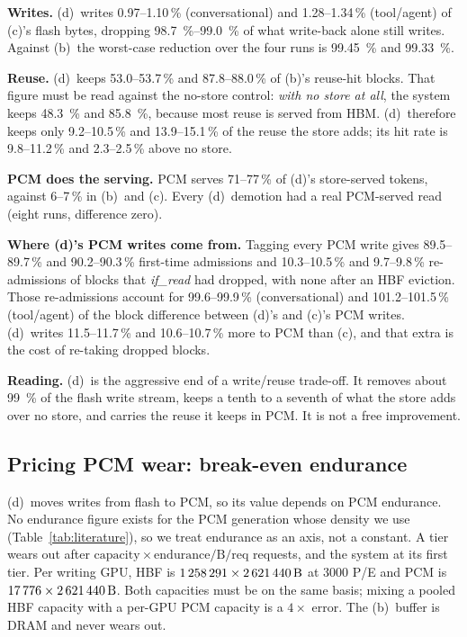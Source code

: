 \documentclass[conference]{IEEEtran}
\newcommand{\cfgb}{\textsf{(b)}}
\newcommand{\cfgc}{\textsf{(c)}}
\newcommand{\cfgd}{\textsf{(d)}}
\begin{document}
\textbf{Writes.} \cfgd\ writes 0.97--1.10\,\% (conversational) and
1.28--1.34\,\% (tool/agent) of \cfgc's flash bytes, dropping
\SIrange{98.7}{99.0}{\percent} of what write-back alone still writes. Against
\cfgb\ the worst-case reduction over the four runs is \SI{99.45}{\percent} and
\SI{99.33}{\percent}.

\textbf{Reuse.} \cfgd\ keeps 53.0--53.7\,\% and 87.8--88.0\,\% of \cfgb's
reuse-hit blocks. That figure must be read against the no-store control:
\emph{with no store at all}, the system keeps \SI{48.3}{\percent} and
\SI{85.8}{\percent}, because most reuse is served from HBM. \cfgd\ therefore
keeps only 9.2--10.5\,\% and 13.9--15.1\,\% of the reuse the store adds; its hit
rate is 9.8--11.2\,\% and 2.3--2.5\,\% above no store.

\textbf{PCM does the serving.} PCM serves 71--77\,\% of \cfgd's store-served
tokens, against 6--7\,\% in \cfgb\ and \cfgc. Every \cfgd\ demotion had a real
PCM-served read (eight runs, difference zero).

\textbf{Where \cfgd's PCM writes come from.} Tagging every PCM write gives
89.5--89.7\,\% and 90.2--90.3\,\% first-time admissions and 10.3--10.5\,\% and
9.7--9.8\,\% re-admissions of blocks that \emph{if\_read} had dropped, with
none after an HBF eviction. Those re-admissions account for 99.6--99.9\,\%
(conversational) and 101.2--101.5\,\% (tool/agent) of the block difference
between \cfgd's and \cfgc's PCM writes. \cfgd\ writes 11.5--11.7\,\% and
10.6--10.7\,\% more to PCM than \cfgc, and that extra is the cost of re-taking
dropped blocks.

\textbf{Reading.} \cfgd\ is the aggressive end of a write/reuse trade-off. It
removes about \SI{99}{\percent} of the flash write stream, keeps a tenth to a
seventh of what the store adds over no store, and carries the reuse it keeps in
PCM. It is not a free improvement.

\subsection{Pricing PCM wear: break-even endurance}\label{sec:endurance}
\cfgd\ moves writes from flash to PCM, so its value depends on PCM endurance.
No endurance figure exists for the PCM generation whose density we use
(Table~\ref{tab:literature}), so we treat endurance as an axis, not a constant.
A tier wears out after
$\text{capacity} \times \text{endurance} / \text{B/req}$ requests, and the
system at its first tier. Per writing GPU, HBF is
$\num{1258291} \times \SI{2621440}{\byte}$ at \num{3000} P/E and PCM is
$\num{17776} \times \SI{2621440}{\byte}$. Both capacities must be on the same
basis; mixing a pooled HBF capacity with a per-GPU PCM capacity is a $4\times$
error. The \cfgb\ buffer is DRAM and never wears out.
\end{document}
